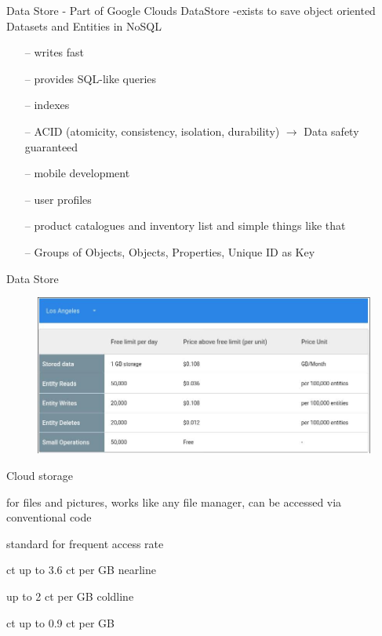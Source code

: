 \documentclass{beamer}
\begin{document}
\begin{frame}{Data Store}
  - Part of Google Clouds DataStore
  -exists to save object oriented Datasets and Entities in NoSQL
  
  \begin{itemize}
  	\item[--] writes fast 
  	\item[--] provides SQL-like queries
  	\item[--] indexes
  	\item[--] ACID (atomicity, consistency, isolation, durability) $\rightarrow$ Data safety guaranteed
  	\item[--] mobile development 
  	\item[--] user profiles 
  	\item[--] product catalogues and inventory list and simple things like that
  	\item[--] Groups of Objects, Objects, Properties,  Unique ID as Key
  	
  \end{itemize}  
\end{frame}
\begin{frame}{Data Store}
	\centering
	\begin{figure}
		\centering
		\includegraphics[width=0.7\linewidth]{datastorecosts}
	
		\label{fig: The Costs }
	\end{figure}
	
\end{frame}
\begin{frame}{Cloud storage}
	\begin{block}{}
     for files and pictures, works like any file manager, can be accessed via conventional code
	\end{block}
	\begin{outline}
		\1[--] standard for frequent access rate 
		
		 ct up to  3.6 ct per GB 
		\1[--] nearline  
			
		 up to 2 ct per GB 
		\1[--] coldline
			
	 ct up to  0.9 ct per GB 
		
	\end{outline}

\end{frame}
\end{document}
